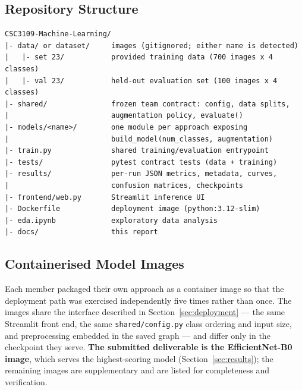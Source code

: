 \documentclass[11pt,twoside,a4paper]{article}
\begin{document}
\subsection{Repository Structure}

\begin{verbatim}
CSC3109-Machine-Learning/
|- data/ or dataset/     images (gitignored; either name is detected)
|   |- set 23/           provided training data (700 images x 4 classes)
|   |- val 23/           held-out evaluation set (100 images x 4 classes)
|- shared/               frozen team contract: config, data splits,
|                        augmentation policy, evaluate()
|- models/<name>/        one module per approach exposing
|                        build_model(num_classes, augmentation)
|- train.py              shared training/evaluation entrypoint
|- tests/                pytest contract tests (data + training)
|- results/              per-run JSON metrics, metadata, curves,
|                        confusion matrices, checkpoints
|- frontend/web.py       Streamlit inference UI
|- Dockerfile            deployment image (python:3.12-slim)
|- eda.ipynb             exploratory data analysis
|- docs/                 this report
\end{verbatim}

\subsection{Containerised Model Images}
\label{sec:appendix-images}

Each member packaged their own approach as a container image so that the
deployment path was exercised independently five times rather than once. The
images share the interface described in Section~\ref{sec:deployment} --- the
same Streamlit front end, the same \texttt{shared/config.py} class ordering and
input size, and preprocessing embedded in the saved graph --- and differ only in
the checkpoint they serve. \textbf{The submitted deliverable is the
EfficientNet-B0 image}, which serves the highest-scoring model
(Section~\ref{sec:results}); the remaining images are supplementary and are
listed for completeness and verification.
\end{document}
